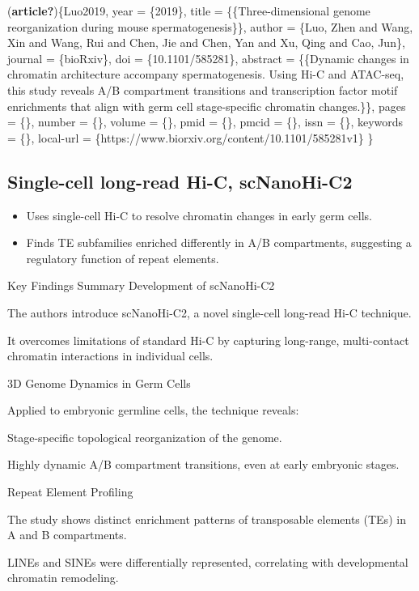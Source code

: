 \documentclass[
  a4paper,
  openany]{scrbook}
\providecommand{\tightlist}{%
  \setlength{\itemsep}{0pt}\setlength{\parskip}{0pt}}
\begin{document}
(\textbf{article?})\{Luo2019, year = \{2019\}, title =
\{\{Three-dimensional genome reorganization during mouse
spermatogenesis\}\}, author = \{Luo, Zhen and Wang, Xin and Wang, Rui
and Chen, Jie and Chen, Yan and Xu, Qing and Cao, Jun\}, journal =
\{bioRxiv\}, doi = \{10.1101/585281\}, abstract = \{\{Dynamic changes in
chromatin architecture accompany spermatogenesis. Using Hi-C and
ATAC-seq, this study reveals A/B compartment transitions and
transcription factor motif enrichments that align with germ cell
stage-specific chromatin changes.\}\}, pages = \{\}, number = \{\},
volume = \{\}, pmid = \{\}, pmcid = \{\}, issn = \{\}, keywords = \{\},
local-url = \{https://www.biorxiv.org/content/10.1101/585281v1\} \}

\subsection{Single-cell long-read Hi-C,
scNanoHi-C2}\label{single-cell-long-read-hi-c-scnanohi-c2}

\begin{itemize}
\tightlist
\item
  Uses single-cell Hi-C to resolve chromatin changes in early germ
  cells.
\item
  Finds TE subfamilies enriched differently in A/B compartments,
  suggesting a regulatory function of repeat elements.
\end{itemize}

Key Findings Summary Development of scNanoHi-C2

The authors introduce scNanoHi-C2, a novel single-cell long-read Hi-C
technique.

It overcomes limitations of standard Hi-C by capturing long-range,
multi-contact chromatin interactions in individual cells.

3D Genome Dynamics in Germ Cells

Applied to embryonic germline cells, the technique reveals:

Stage-specific topological reorganization of the genome.

Highly dynamic A/B compartment transitions, even at early embryonic
stages.

Repeat Element Profiling

The study shows distinct enrichment patterns of transposable elements
(TEs) in A and B compartments.

LINEs and SINEs were differentially represented, correlating with
developmental chromatin remodeling.
\end{document}
